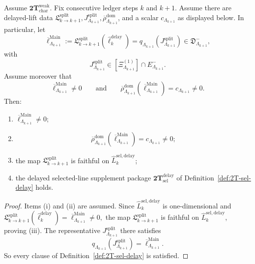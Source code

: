 \begin{theorem}
\label{thm:Main-delayed-selected-line-contract}
Assume \(\mathbf{2T}_{\mathrm{char}}^{\mathrm{weak}}\).
Fix consecutive ledger steps \(k\) and \(k+1\).
Assume there are delayed-lift data
\(
\mathfrak L^{\mathrm{split}}_{k\to k+1},
J^{\mathrm{split}}_{\Lambda_{k+1}},
\overline\rho^{\mathrm{dom}}_{\Lambda_{k+1}}
\),
and a scalar \(c_{\Lambda_{k+1}}\) as displayed below.
In particular, let
\[
\overline\ell^{\mathrm{Main}}_{\Lambda_{k+1}}
:=
\mathfrak L^{\mathrm{split}}_{k\to k+1}(\widehat\ell^{\mathrm{delay}}_k)
=
q_{\Lambda_{k+1}}(J^{\mathrm{split}}_{\Lambda_{k+1}})
\in
\mathfrak D^-_{\Lambda_{k+1}},
\]
with
\[
J^{\mathrm{split}}_{\Lambda_{k+1}}
\in
[\Xi^{(1)}_{\Lambda_{k+1}}]\cap E^-_{\Lambda_{k+1}}.
\]
Assume moreover that
\[
\overline\ell^{\mathrm{Main}}_{\Lambda_{k+1}}\neq 0
\qquad\text{and}\qquad
\overline\rho^{\mathrm{dom}}_{\Lambda_{k+1}}
(\overline\ell^{\mathrm{Main}}_{\Lambda_{k+1}})
=
c_{\Lambda_{k+1}}\neq 0.
\]
Then:
\begin{enumerate}[label=\textnormal{(\roman*)},leftmargin=*,itemsep=0.3em]
\item
  \(
  \overline\ell^{\mathrm{Main}}_{\Lambda_{k+1}}\neq 0
  \);
\item
  \[
  \overline\rho^{\mathrm{dom}}_{\Lambda_{k+1}}
  (\overline\ell^{\mathrm{Main}}_{\Lambda_{k+1}})
  =
  c_{\Lambda_{k+1}}\neq 0;
  \]
\item the map
  \(
  \mathfrak L^{\mathrm{split}}_{k\to k+1}
  \)
  is faithful on
  \(
  \widehat L^{\mathrm{sel,delay}}_k
  \);
\item the delayed selected-line supplement package
  \(\mathbf{2T}_{\mathrm{sel}}^{\mathrm{delay}}\)
  of Definition~\ref{def:2T-sel-delay} holds.
\end{enumerate}
\end{theorem}

\begin{proof}
Items \textnormal{(i)} and \textnormal{(ii)} are assumed.
Since \(\widehat L^{\mathrm{sel,delay}}_k\) is one-dimensional and
\(
\mathfrak L^{\mathrm{split}}_{k\to k+1}
(\widehat\ell^{\mathrm{delay}}_k)
=
\overline\ell^{\mathrm{Main}}_{\Lambda_{k+1}}
\neq 0,
\)
the map \(\mathfrak L^{\mathrm{split}}_{k\to k+1}\) is faithful on
\(\widehat L^{\mathrm{sel,delay}}_k\), proving
\textnormal{(iii)}.
The representative
\(
J^{\mathrm{split}}_{\Lambda_{k+1}}
\)
there satisfies
\[
q_{\Lambda_{k+1}}(J^{\mathrm{split}}_{\Lambda_{k+1}})
=
\overline\ell^{\mathrm{Main}}_{\Lambda_{k+1}}.
\]
So every clause of Definition~\ref{def:2T-sel-delay} is satisfied.
\end{proof}


